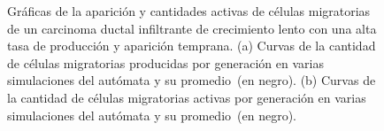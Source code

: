 \begin{figure}[p]
\begin{center}
\vspace*{-0.25cm}
\end{center}\vspace*{-0.6cm}
\caption[Gr\'aficas de la aparici\'on y cantidades activas de c\'elulas migratorias de un carcinoma ductal infiltrante de crecimiento lento con una alta tasa de producci\'on y aparici\'on temprana]{Gr\'aficas de la aparici\'on y cantidades activas de c\'elulas migratorias de un carcinoma ductal infiltrante de crecimiento lento con una alta tasa de producci\'on y aparici\'on temprana. (a) Curvas de la cantidad de c\'elulas migratorias producidas por generaci\'on en varias simulaciones del aut\'omata y su promedio~(en negro). (b) Curvas de la cantidad de c\'elulas migratorias activas por generaci\'on en varias simulaciones del aut\'omata y su promedio~(en negro).}
\label{graph-superior-migra}
\end{figure}

